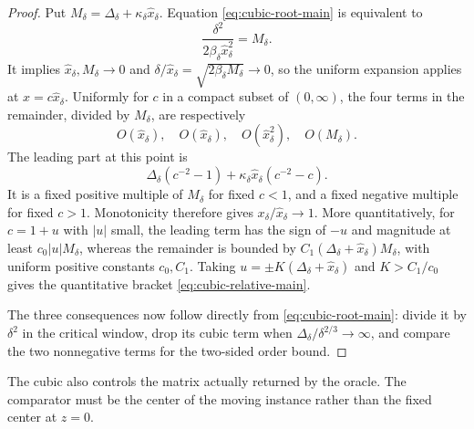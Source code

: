 \begin{proof}
Put
\(M_\delta=\Delta_\delta+\kappa_\delta\widehat x_\delta\).  Equation
\eqref{eq:cubic-root-main} is equivalent to
\[
 \frac{\delta^2}{2\beta_\delta\widehat x_\delta^2}=M_\delta.
\]
It implies \(\widehat x_\delta,M_\delta\to0\) and
\(\delta/\widehat x_\delta=\sqrt{2\beta_\delta M_\delta}\to0\), so the
uniform expansion applies at \(x=c\widehat x_\delta\).  Uniformly for \(c\)
in a compact subset of \((0,\infty)\), the four terms in the remainder,
divided by \(M_\delta\), are respectively
\[
 O(\widehat x_\delta),\quad O(\widehat x_\delta),\quad
 O(\widehat x_\delta^2),\quad O(M_\delta).
\]
The leading part at this point is
\[
 \Delta_\delta(c^{-2}-1)
 +\kappa_\delta\widehat x_\delta(c^{-2}-c).
\]
It is a fixed positive multiple of \(M_\delta\) for fixed \(c<1\), and a
fixed negative multiple for fixed \(c>1\).  Monotonicity therefore gives
\(x_\delta/\widehat x_\delta\to1\).  More quantitatively, for
\(c=1+u\) with \(|u|\) small, the leading term has the sign of \(-u\) and
magnitude at least \(c_0|u|M_\delta\), whereas the remainder is bounded by
\(C_1(\Delta_\delta+\widehat x_\delta)M_\delta\), with uniform positive
constants \(c_0,C_1\).  Taking
\(u=\pm K(\Delta_\delta+\widehat x_\delta)\) and
\(K>C_1/c_0\) gives the quantitative bracket
\eqref{eq:cubic-relative-main}.

The three consequences now follow directly from
\eqref{eq:cubic-root-main}: divide it by \(\delta^2\) in the critical window,
drop its cubic term when \(\Delta_\delta/\delta^{2/3}\to\infty\), and compare
the two nonnegative terms for the two-sided order bound.
\end{proof}

The cubic also controls the matrix actually returned by the oracle.  The
comparator must be the center of the moving instance rather than the fixed
center at \(z=0\).


